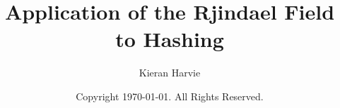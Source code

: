 \documentclass[12pt]{report}
\title{Application of the Rjindael Field to Hashing}
\date{Copyright \textcopyright  \today. All Rights Reserved.}
\author{Kieran Harvie}
\begin{document}
\maketitle
\tableofcontents






\renewcommand{\thechapter}{A}

\end{document}
